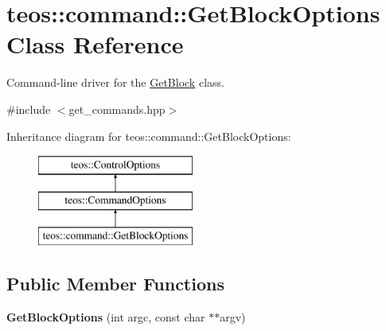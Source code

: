 \hypertarget{classteos_1_1command_1_1_get_block_options}{}\section{teos\+:\+:command\+:\+:Get\+Block\+Options Class Reference}
\label{classteos_1_1command_1_1_get_block_options}


Command-\/line driver for the \mbox{\hyperlink{classteos_1_1command_1_1_get_block}{Get\+Block}} class.  




{\ttfamily \#include $<$get\+\_\+commands.\+hpp$>$}

Inheritance diagram for teos\+:\+:command\+:\+:Get\+Block\+Options\+:\begin{figure}[H]
\begin{center}
\leavevmode
\includegraphics[height=3.000000cm]{classteos_1_1command_1_1_get_block_options}
\end{center}
\end{figure}
\subsection*{Public Member Functions}
\begin{DoxyCompactItemize}
\item 
\mbox{\label{classteos_1_1command_1_1_get_block_options_ad9e83d4b0beddabb25ee7089ae8ef55a}} 
{\bfseries Get\+Block\+Options} (int argc, const char $\ast$$\ast$argv)
\end{DoxyCompactItemize}
